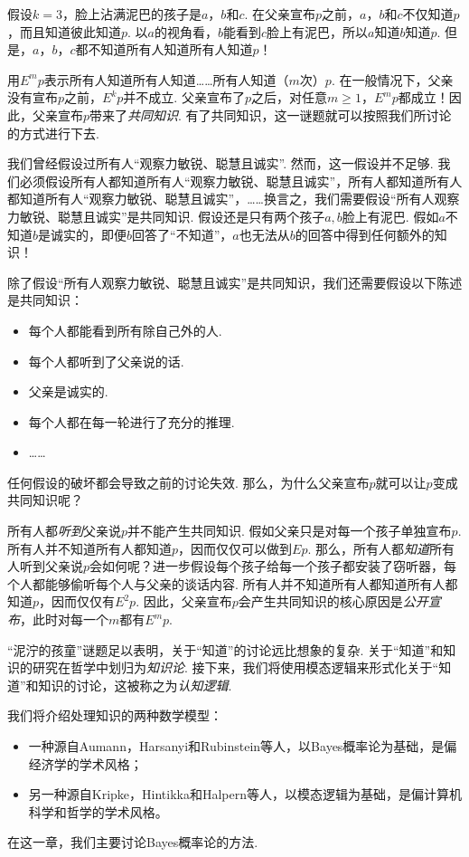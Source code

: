 假设$k=3$，脸上沾满泥巴的孩子是$a$，$b$和$c$. 在父亲宣布$p$之前，$a$，$b$和$c$不仅知道$p$，而且知道彼此知道$p$. 以$a$的视角看，$b$能看到$c$脸上有泥巴，所以$a$知道$b$知道$p$. 但是，$a$，$b$，$c$都不知道所有人知道所有人知道$p$！


用$E^m p$表示所有人知道所有人知道……所有人知道（$m$次）$p$. 在一般情况下，父亲没有宣布$p$之前，$E^k p$并不成立. 父亲宣布了$p$之后，对任意$m\geq 1$，$E^m p$都成立！因此，父亲宣布$p$带来了\emph{共同知识}. 有了共同知识，这一谜题就可以按照我们所讨论的方式进行下去.

我们曾经假设过所有人“观察力敏锐、聪慧且诚实”. 然而，这一假设并不足够. 我们必须假设所有人都知道所有人“观察力敏锐、聪慧且诚实”，所有人都知道所有人都知道所有人“观察力敏锐、聪慧且诚实”，……换言之，我们需要假设“所有人观察力敏锐、聪慧且诚实”是共同知识. 假设还是只有两个孩子$a,b$脸上有泥巴. 假如$a$不知道$b$是诚实的，即便$b$回答了“不知道”，$a$也无法从$b$的回答中得到任何额外的知识！

除了假设“所有人观察力敏锐、聪慧且诚实”是共同知识，我们还需要假设以下陈述是共同知识：
    \begin{itemize}
        \item 每个人都能看到所有除自己外的人.
        \item 每个人都听到了父亲说的话.
        \item 父亲是诚实的.
        \item 每个人都在每一轮进行了充分的推理.
        \item ……
    \end{itemize}
任何假设的破坏都会导致之前的讨论失效. 那么，为什么父亲宣布$p$就可以让$p$变成共同知识呢？

所有人都\emph{听到}父亲说$p$并不能产生共同知识. 假如父亲只是对每一个孩子单独宣布$p$. 所有人并不知道所有人都知道$p$，因而仅仅可以做到$E p$. 那么，所有人都\emph{知道}所有人听到父亲说$p$会如何呢？进一步假设每个孩子给每一个孩子都安装了窃听器，每个人都能够偷听每个人与父亲的谈话内容. 所有人并不知道所有人都知道所有人都知道$p$，因而仅仅有$E^2 p$. 因此，父亲宣布$p$会产生共同知识的核心原因是\emph{公开宣布}，此时对每一个$m$都有$E^m p$.

“泥泞的孩童”谜题足以表明，关于“知道”的讨论远比想象的复杂. 关于“知道”和知识的研究在哲学中划归为\emph{知识论}. 接下来，我们将使用模态逻辑来形式化关于“知道”和知识的讨论，这被称之为\emph{认知逻辑}.

我们将介绍处理知识的两种数学模型：
\begin{itemize}
    \item 一种源自Aumann，Harsanyi和Rubinstein等人，以Bayes概率论为基础，是偏经济学的学术风格；
    \item 另一种源自Kripke，Hintikka和Halpern等人，以模态逻辑为基础，是偏计算机科学和哲学的学术风格。
\end{itemize}
在这一章，我们主要讨论Bayes概率论的方法.

